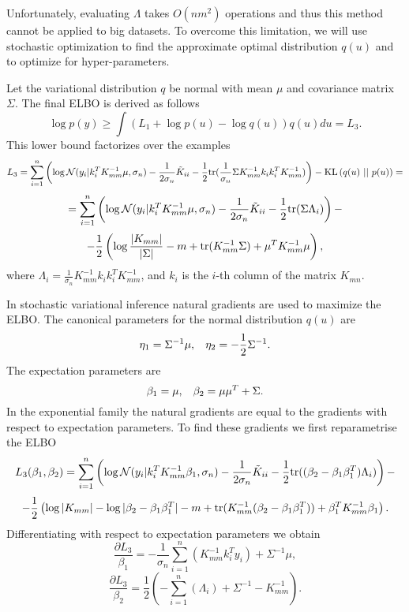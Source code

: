 \documentclass[12pt]{article}
\begin{document}
	Unfortunately, evaluating $\Lambda$ takes $O(n m^2)$ operations and thus this method cannot be applied to big datasets. To overcome this limitation, we will use stochastic optimization to find the approximate optimal distribution $q(u)$ and to optimize for hyper-parameters. 
	
	Let the variational distribution $q$ be normal with mean $\mu$ and covariance matrix $\Sigma$. The final ELBO is derived as follows
	$$\log p(y) \ge \int \left( L_1 + \log p(u) - \log q(u)\right) q(u) du = L_3.$$
	This lower bound factorizes over the examples 
	$$L_3 = \sum_{i = 1}^{n} \left( \log \mathcal{N}(y_i | k_i^T K_{mm}^{-1} \mu, \sigma_n) - \frac 1 {2 \sigma_n} \tilde K_{ii} - \frac 1 2 \mbox{tr} (\frac 1 {\sigma_n} \Sigma K_{mm}^{-1} k_i k_i^T K_{mm}^{-1}) \right) - \mbox{KL}\left(q(u)\mbox{ || }p(u)\right) = $$
	$$ = \sum_{i = 1}^{n} \left( \log \mathcal{N}(y_i | k_i^T K_{mm}^{-1} \mu, \sigma_n) - \frac 1 {2 \sigma_n} \tilde K_{ii} - \frac 1 2 \mbox{tr} (\Sigma \Lambda_i) \right) - $$
	$$ -\frac 1 2 \left (\log \frac {|K_{mm}|} {|\Sigma|} - m + \mbox{tr}(K_{mm}^{-1} \Sigma) + \mu^T K_{mm}^{-1} \mu \right),$$
	where $\Lambda_i = \frac 1 {\sigma_n} K_{mm}^{-1} k_i k_i^T K_{mm}^{-1}$, and $k_i$ is the $i$-th column of the matrix $K_{mn}$.
	
	In stochastic variational inference natural gradients are used to maximize the ELBO. The canonical parameters for the normal distribution $q(u)$ are
	$$\eta_1 = \Sigma^{-1} \mu, \hspace{0.3cm}\eta_2 = - \frac 1 2 \Sigma^{-1}.$$
	The expectation parameters are
	$$\beta_1 = \mu, \hspace{0.3cm}\beta_2 = \mu \mu^T + \Sigma.$$
	In the exponential family the natural gradients are equal to the gradients with respect to expectation parameters. To find these gradients we first reparametrise the ELBO
	$$L_3(\beta_1, \beta_2) =  \sum_{i = 1}^{n} \left( \log \mathcal{N}(y_i | k_i^T K_{mm}^{-1} \beta_1, \sigma_n) - \frac 1 {2 \sigma_n} \tilde K_{ii} - \frac 1 2 \mbox{tr} ((\beta_2 - \beta_1 \beta_1^T) \Lambda_i) \right) - $$
	$$ -\frac 1 2 \left (\log |K_{mm}| - \log |\beta_2 - \beta_1 \beta_1^T| - m + \mbox{tr}(K_{mm}^{-1} (\beta_2 - \beta_1 \beta_1^T)) + \beta_1^T K_{mm}^{-1} \beta_1 \right).$$
	Differentiating with respect to expectation parameters we obtain
	\begin{equation}
		\label{natgrad1}
		\frac{\partial L_3} {\beta_1} =  -\frac 1 {\sigma_n}  \sum_{i = 1}^{n} \left(K_{mm}^{-1} k_i^T y_i \right) + \Sigma^{-1} \mu,
	\end{equation}
	\begin{equation}
		\label{natgrad2}
		\frac{\partial L_3} {\beta_2} = \frac 1 {2} \left(-\sum_{i = 1}^{n} (\Lambda_i) + \Sigma^{-1}  - K_{mm}^{-1}\right).
	\end{equation}
	
\end{document}

